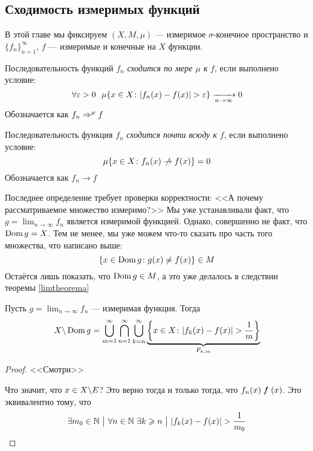 \subsection{Сходимость измеримых функций}

\begin{note}
	В этой главе мы фиксируем $(X, M, \mu)$ --- измеримое $\sigma$-конечное пространство и $\{f_n\}_{n = 1}^\infty$, $f$ --- измеримые и конечные на $X$ функции.
\end{note}

\begin{definition}
	Последовательность функций $f_n$ \textit{сходится по мере $\mu$ к} $f$, если выполнено условие:
	\[
		\forall \varepsilon > 0\ \ \mu\{x \in X \colon |f_n(x) - f(x)| > \varepsilon\} \xrightarrow[n \to \infty]{} 0
	\]
	Обозначается как $f_n \Rightarrow^\mu f$
\end{definition}

\begin{definition}
	Последовательность функция $f_n$ \textit{сходится почти всюду к} $f$, если выполнено условие:
	\[
		\mu\{x \in X \colon f_n(x) \centernot\to f(x)\} = 0
	\]
	Обозначается как $f_n \to f$
\end{definition}

\begin{note}
	Последнее определение требует проверки корректности: <<А почему рассматриваемое множество измеримо?>> Мы уже устанавливали факт, что $g = \lim_{n \to \infty} f_n$ является измеримой функцией. Однако, совершенно не факт, что $\operatorname{Dom} g = X$. Тем не менее, мы уже можем что-то сказать про часть того множества, что написано выше:
	\[
		\{x \in \operatorname{Dom} g \colon g(x) \neq f(x)\} \in M
	\]
	Остаётся лишь показать, что $\operatorname{Dom} g \in M$, а это уже делалось в следствии теоремы \ref{limtheorema}
\end{note}

\begin{lemma}
	Пусть $g = \lim_{n \to \infty} f_n$ --- измеримая функция. Тогда
	\[
		X \backslash \operatorname{Dom} g = \bigcup_{m = 1}^\infty \bigcap_{n = 1}^\infty \bigcup_{k = n}^\infty \underbrace{\left\{x \in X \colon |f_k(x) - f(x)| > \frac{1}{m}\right\}}_{F_{k, m}}
	\]
\end{lemma}

\begin{proof}
	<<Смотри>>
	
	Что значит, что $x \in X \backslash E$? Это верно тогда и только тогда, что $f_n(x) \centernot f(x)$. Это эквивалентно тому, что
	\[
		\exists m_0 \in \N \such \forall n \in \N\ \exists k \ge n \such |f_k(x) - f(x)| > \frac{1}{m_0}
	\]
\end{proof}

